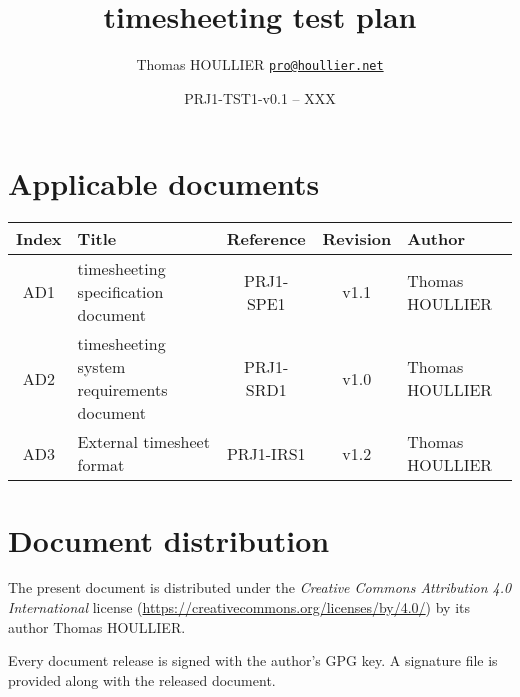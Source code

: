 \documentclass[letterpaper]{article}
\title{timesheeting test plan}
\author{Thomas HOULLIER \href{mailto:pro@houllier.net}
         {\texttt{\textlangle pro@houllier.net\textrangle}}}
\begin{document}
\frenchspacing
\date{PRJ1-TST1-v0.1 -- XXX}
\maketitle
\thispagestyle{FirstPage}

\begin{abstract}
\end{abstract}

\begin{versionhistory}
\end{versionhistory}
\setcounter{table}{0} %

\section*{Applicable documents}
{ \centering
\begin{tabularx}{\textwidth}{| c | X | c | c | X |} \hline
  Index & Title & Reference & Revision & Author \\ \hline
  AD1   & timesheeting specification document & PRJ1-SPE1
                            & v1.1 & Thomas HOULLIER \\ \hline
  AD2   & timesheeting system requirements document & PRJ1-SRD1
                            & v1.0 & Thomas HOULLIER \\ \hline
  AD3   & External timesheet format & PRJ1-IRS1
                            & v1.2 & Thomas HOULLIER \\ \hline
\end{tabularx} \par }

\section*{Document distribution}
The present document is distributed under the \emph{Creative Commons Attribution
4.0 International} license (\url{https://creativecommons.org/licenses/by/4.0/})
by its author Thomas HOULLIER.

Every document release is signed with the author's GPG key. A signature file
is provided along with the released document.

\tableofcontents
\printglossary[type=\acronymtype,style=index]
\pagestyle{plain}






\appendix


\apptocmd{\thebibliography}{\raggedright}{}{}
\begingroup
{}
\setlength\bibitemsep{0pt}
\printbibliography
\endgroup
\end{document}
